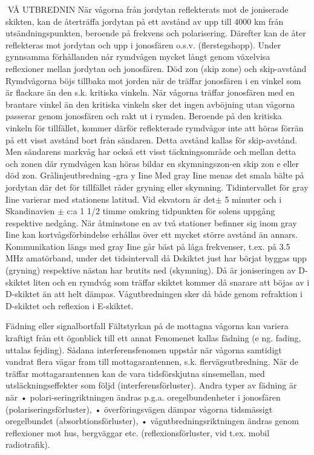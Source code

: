 VÅ UTBREDNIN
När vågorna från jordytan reflekterats
mot de joniserade skikten, kan de återträffa
jordytan på ett avstånd av upp till 4000 km
från utsändningspunkten, beroende på frekvens och polarisering. Därefter kan de åter
reflekteras mot jordytan och upp i jonosfären o.s.v. (flerstegshopp). Under gynnsamma förhållanden når rymdvågen mycket
långt genom växelvisa reflexioner mellan
jordytan och jonosfären.
Död zon (skip zone) och skip-avstånd
Rymdvågorna böjs tillbaka mot jorden när
de träffar jonosfären i en vinkel som är
flackare än den s.k. kritiska vinkeln. När
vågorna träffar jonosfären med en brantare
vinkel än den kritiska vinkeln sker det ingen
avböjning utan vågorna passerar genom
jonosfären och rakt ut i rymden. Beroende
på den kritiska vinkeln för tillfället, kommer
därför reflekterade rymdvågor inte att höras
förrän på ett visst avstånd bort från sändaren. Detta avstånd kallas för skip-avstånd.
Men sändarens markvåg har också ett
visst täckningsområde och mellan detta och
zonen där rymdvågen kan höras bildar en
skymningszon-en skip zon e eller död zon.
Grålinjeutbredning -gra y Iine
Med gray Iine menas det smala bälte på
jordytan där det för tillfället råder gryning
eller skymning.
Tidintervallet för gray Iine varierar med
stationens latitud. Vid ekvatorn är det\(\pm\) 5
minuter och i Skandinavien \(\pm\) c:a 1 1/2
timme omkring tidpunkten för solens uppgång respektive nedgång.
När åtminstone en av två stationer befinner sig inom gray Iine kan kortvågsförbindelse erhållas över ett mycket större
avstånd än annars.
Kommunikation längs med gray Iine går
bäst på låga frekvenser, t.ex. på 3.5 MHz
amatörband, under det tidsintervall då Dskiktet just har börjat byggas upp (gryning)
respektive nästan har brutits ned (skymning). Då är joniseringen av D-skiktet liten
och en rymdvåg som träffar skiktet kommer
då snarare att böjas av i D-skiktet än att helt
dämpas. Vågutbredningen sker då både
genom refraktion i D-skiktet och reflexion i
E-skiktet.

Fädning eller signalbortfall
Fältstyrkan på de mottagna vågorna kan
variera kraftigt från ett ögonblick till ett annat
Fenomenet kallas fädning (e ng. fading, uttalas fejding).
Sådana interferensfenomen uppstår när
vågorna samtidigt vandrat flera vägar fram
till mottagarantennen, s.k. flervägsutbredning. När de träffar mottagarantennen kan
de vara tidsförskjutna sinsemellan, med utsläckningseffekter som följd (interferensförluster).
Andra typer av fädning är när
• polari-seringriktningen ändras p.g.a. oregelbundenheter i jonosfären (polariseringsförluster),
• överföringsvägen dämpar vågorna tidsmässigt oregelbundet (absorbtionsförluster),
• vågutbredningsriktningen ändras genom
reflexioner mot hus, bergväggar etc.
(reflexionsförluster, vid t.ex. mobil radiotrafik).

